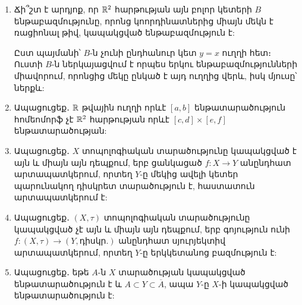 \begin{enumerate}[label=\thesection.\arabic*.]
\item Ճի՞շտ է արդյոք, որ $\mathbb{R}^2$ հարթության այն բոլոր կետերի $B$ ենթաբազմությունը, որոնց կոորդինատներից միայն մեկն է ռացիոնալ թիվ, կապակցված ենթա\-բազ\-մություն է:
\begin{hint}
Ըստ պայմանի՝ $B$-ն չունի ընդհանուր կետ $y=x$ ուղղի հետ։ Ուստի $B$-ն ներկայացվում է որպես երկու ենթաբազմությունների միավորում, որոնցից մեկը ընկած է այդ ուղղից վերև, իսկ մյուսը՝ ներքև:
\end{hint}

\item Ապացուցեք․ $\mathbb{R}$ թվային ուղղի որևէ $[a,b]$ ենթատարածություն հոմեոմորֆ չէ $\mathbb{R}^2$ հարթության որևէ $[c,d] \times [e,f]$ ենթատարածության:

\item Ապացուցեք․ $X$ տոպոլոգիական տարածությունը կապակցված է այն և միայն այն դեպքում, երբ ցանկացած $f: X \to Y$ անընդհատ արտապատկերում, որ\-տեղ $Y$-ը մեկից ավելի կետեր պարունակող դիսկրետ տարածություն է, հաս\-տա\-տուն արտապատկերում է:

\item Ապացուցեք․ $(X, \tau)$ տոպոլոգիական տարածությունը կապակցված չէ այն և մի\-այն այն դեպքում, երբ գոյություն ունի $f: (X, \tau) \to (Y, \text{դիսկր.})$ անընդհատ սյուրյեկտիվ արտապատկերում, որտեղ $Y$-ը երկկետանոց բազմություն է:

\item Ապացուցեք․ եթե $A$-ն $X$ տարածության կապակցված ենթատարածություն է և $A \subset Y \subset \overline{A}$, ապա $Y$-ը $X$-ի կապակցված ենթատարածություն է:

\end{enumerate}
